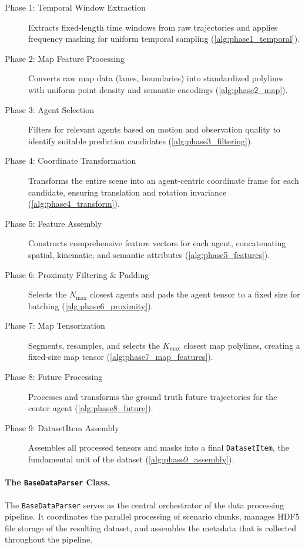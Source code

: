 \begin{description}
    \item[Phase 1: Temporal Window Extraction] Extracts fixed-length time windows from raw trajectories and applies frequency masking for uniform temporal sampling (\autoref{alg:phase1_temporal}).
    \item[Phase 2: Map Feature Processing] Converts raw map data (lanes, boundaries) into standardized polylines with uniform point density and semantic encodings (\autoref{alg:phase2_map}).
    \item[Phase 3: Agent Selection] Filters for relevant agents based on motion and observation quality to identify suitable prediction candidates (\autoref{alg:phase3_filtering}).
    \item[Phase 4: Coordinate Transformation] Transforms the entire scene into an agent-centric coordinate frame for each candidate, ensuring translation and rotation invariance (\autoref{alg:phase4_transform}).
    \item[Phase 5: Feature Assembly] Constructs comprehensive feature vectors for each agent, concatenating spatial, kinematic, and semantic attributes (\autoref{alg:phase5_features}).
    \item[Phase 6: Proximity Filtering \& Padding] Selects the \(N_{\max}\) closest agents and pads the agent tensor to a fixed size for batching (\autoref{alg:phase6_proximity}).
    \item[Phase 7: Map Tensorization] Segments, resamples, and selects the \(K_{\max}\) closest map polylines, creating a fixed-size map tensor (\autoref{alg:phase7_map_features}).
    \item[Phase 8: Future Processing] Processes and transforms the ground truth future trajectories for the center agent (\autoref{alg:phase8_future}).
    \item[Phase 9: DatasetItem Assembly] Assembles all processed tensors and masks into a final \texttt{DatasetItem}, the fundamental unit of the dataset (\autoref{alg:phase9_assembly}).
\end{description}

\paragraph{The \texttt{BaseDataParser} Class.}
The \texttt{BaseDataParser} serves as the central orchestrator of the data processing pipeline. It coordinates the parallel processing of scenario chunks, manages HDF5 file storage of the resulting dataset, and assembles the metadata that is collected throughout the pipeline.\\

